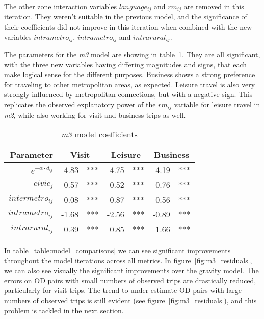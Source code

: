 The other zone interaction variables $language_{ij}$  and $rm_{ij}$  are removed in this iteration. They weren't suitable in the previous model, and the significance of their coefficients did not improve in this iteration when combined with the new variables $intrametro_{ij}$,  $intrametro_{ij}$ and $intrarural_{ij}$.


The parameters for the \textit{m3} model are showing in table~\ref{table:m3-coeff}. They are all significant, with the three new variables having differing magnitudes and signs, that each make logical sense for the different purposes. Business shows a strong preference for traveling to other metropolitan areas, as expected. Leisure travel is also very strongly influenced by metropolitan connections, but with a negative sign. This replicates the observed explanatory power of the $rm_{ij}$ variable for leisure travel in \textit{m2}, while also working for visit and business trips as well.


\begin{table}[H]
\centering
\caption{\textit{m3} model coefficients}
\label{table:m3-coeff}
\begin{tabular}{@{}rrlrlrl@{}}
  \toprule
 Parameter & \multicolumn{2}{c}{Visit} & \multicolumn{2}{c}{Leisure} & \multicolumn{2}{c}{Business} \\ \midrule
  $e^{-\alpha \cdot d_{ij}}$ 	& 4.83 & *** & 4.75 & *** & 4.19 & *** \\  
  $civic_j$ & 0.57 & *** & 0.52 & *** & 0.76 & *** \\ 
  $intermetro_{ij}$ & -0.08 & *** & -0.87 & *** & 0.56 & *** \\ 
  $intrametro_{ij}$ & -1.68 & *** & -2.56 & *** & -0.89 & *** \\  
  $intrarural_{ij}$ & 0.39 & *** & 0.85 & *** & 1.66 & *** \\ 
   \bottomrule
\end{tabular}
\end{table}

In table~\ref{table:model_comparisons} we can see significant improvements throughout the model iterations across all metrics. In figure~\ref{fig:m3_residuals}, we can also see visually the significant improvements over the gravity model. The errors on OD pairs with small numbers of observed trips are drastically reduced, particularly for visit trips. The trend to under-estimate OD pairs with large numbers of observed trips is still evident (see figure~\ref{fig:m3_residuals}), and this problem is tackled in the next section. 


